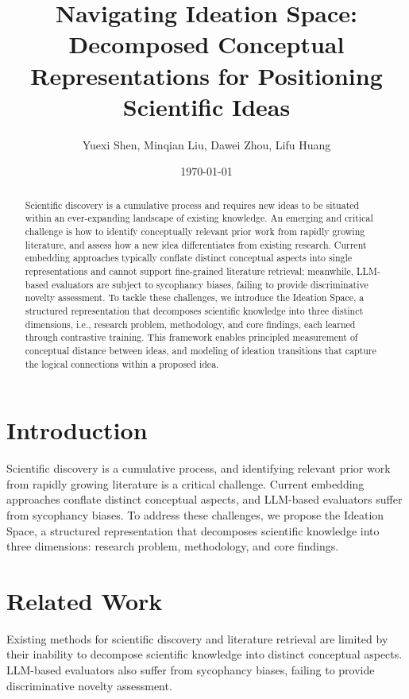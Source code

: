 \documentclass{article}
\title{Navigating Ideation Space: Decomposed Conceptual Representations for Positioning Scientific Ideas}
\author{Yuexi Shen, Minqian Liu, Dawei Zhou, Lifu Huang}
\date{\today}
\begin{document}
\maketitle

\begin{abstract}
Scientific discovery is a cumulative process and requires new ideas to be situated within an ever-expanding landscape of existing knowledge. An emerging and critical challenge is how to identify conceptually relevant prior work from rapidly growing literature, and assess how a new idea differentiates from existing research. Current embedding approaches typically conflate distinct conceptual aspects into single representations and cannot support fine-grained literature retrieval; meanwhile, LLM-based evaluators are subject to sycophancy biases, failing to provide discriminative novelty assessment. To tackle these challenges, we introduce the Ideation Space, a structured representation that decomposes scientific knowledge into three distinct dimensions, i.e., research problem, methodology, and core findings, each learned through contrastive training. This framework enables principled measurement of conceptual distance between ideas, and modeling of ideation transitions that capture the logical connections within a proposed idea.
\end{abstract}

\section{Introduction}

Scientific discovery is a cumulative process, and identifying relevant prior work from rapidly growing literature is a critical challenge. Current embedding approaches conflate distinct conceptual aspects, and LLM-based evaluators suffer from sycophancy biases. To address these challenges, we propose the Ideation Space, a structured representation that decomposes scientific knowledge into three dimensions: research problem, methodology, and core findings.

\section{Related Work}

Existing methods for scientific discovery and literature retrieval are limited by their inability to decompose scientific knowledge into distinct conceptual aspects. LLM-based evaluators also suffer from sycophancy biases, failing to provide discriminative novelty assessment.
\end{document}
